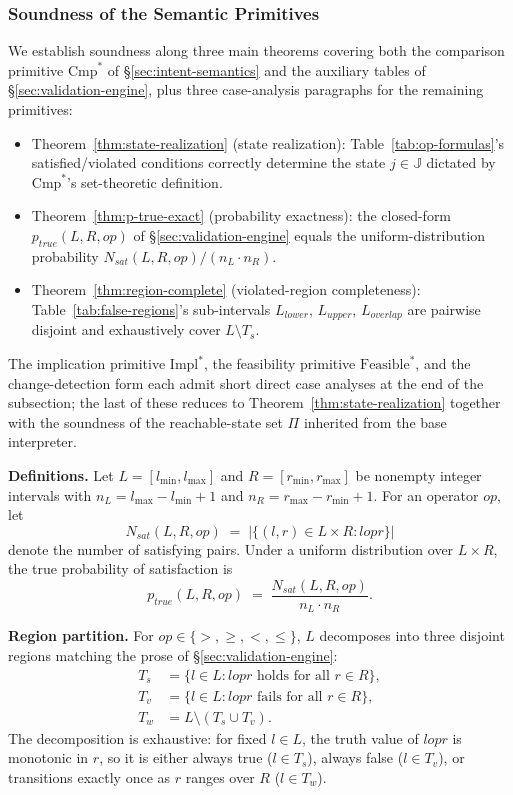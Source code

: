 \documentclass[pdflatex,sn-basic]{sn-jnl}%
\theoremstyle{thmstyleone}%
\theoremstyle{thmstyletwo}%
\theoremstyle{thmstylethree}%
\begin{document}
\subsubsection{Soundness of the Semantic Primitives}\label{sec:soundness}

We establish soundness along three main theorems covering both the comparison primitive $\text{Cmp}^*$ of §\ref{sec:intent-semantics} and the auxiliary tables of §\ref{sec:validation-engine}, plus three case-analysis paragraphs for the remaining primitives:
\begin{itemize}
    \item Theorem~\ref{thm:state-realization} (state realization): Table~\ref{tab:op-formulas}'s satisfied/violated conditions correctly determine the state $j \in \mathbb{J}$ dictated by $\text{Cmp}^*$'s set-theoretic definition.
    \item Theorem~\ref{thm:p-true-exact} (probability exactness): the closed-form $p_{\mathit{true}}(L, R, op)$ of §\ref{sec:validation-engine} equals the uniform-distribution probability $N_{\mathit{sat}}(L, R, op) / (n_L \cdot n_R)$.
    \item Theorem~\ref{thm:region-complete} (violated-region completeness): Table~\ref{tab:false-regions}'s sub-intervals $L_{\mathit{lower}}$, $L_{\mathit{upper}}$, $L_{\mathit{overlap}}$ are pairwise disjoint and exhaustively cover $L \setminus T_s$.
\end{itemize}
The implication primitive $\text{Impl}^*$, the feasibility primitive $\text{Feasible}^*$, and the change-detection form each admit short direct case analyses at the end of the subsection; the last of these reduces to Theorem~\ref{thm:state-realization} together with the soundness of the reachable-state set $\Pi$ inherited from the base interpreter.

\smallskip
\noindent\textbf{Definitions.}
Let $L = [l_{\min}, l_{\max}]$ and $R = [r_{\min}, r_{\max}]$ be nonempty integer intervals with $n_L = l_{\max} - l_{\min} + 1$ and $n_R = r_{\max} - r_{\min} + 1$. For an operator $op$, let
\[
N_{\mathit{sat}}(L, R, op) \;=\; \big|\{(l, r) \in L \times R : l \mathrel{op} r\}\big|
\]
denote the number of satisfying pairs. Under a uniform distribution over $L \times R$, the true probability of satisfaction is
\[
p_{\mathit{true}}(L, R, op) \;=\; \frac{N_{\mathit{sat}}(L, R, op)}{n_L \cdot n_R}.
\]

\smallskip
\noindent\textbf{Region partition.}
For $op \in \{>, \geq, <, \leq\}$, $L$ decomposes into three disjoint regions matching the prose of §\ref{sec:validation-engine}:
\begin{align*}
T_s &= \{l \in L : l \mathrel{op} r \text{ holds for all } r \in R\}, \\
T_v &= \{l \in L : l \mathrel{op} r \text{ fails for all } r \in R\}, \\
T_w &= L \setminus (T_s \cup T_v).
\end{align*}
The decomposition is exhaustive: for fixed $l \in L$, the truth value of $l \mathrel{op} r$ is monotonic in $r$, so it is either always true ($l \in T_s$), always false ($l \in T_v$), or transitions exactly once as $r$ ranges over $R$ ($l \in T_w$).
\end{document}
